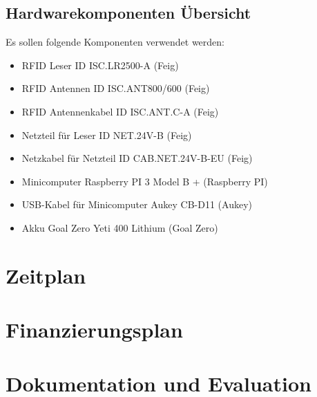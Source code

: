 \section{Hardwarekomponenten Übersicht}
Es sollen folgende Komponenten verwendet werden:
\begin{itemize}
	\item RFID Leser ID ISC.LR2500-A  (Feig)
	\item RFID Antennen ID ISC.ANT800/600 (Feig)
	\item RFID Antennenkabel ID ISC.ANT.C-A (Feig)
	\item Netzteil für Leser ID NET.24V-B (Feig)
	\item Netzkabel für Netzteil ID CAB.NET.24V-B-EU  (Feig)
	\item Minicomputer Raspberry PI 3 Model B + (Raspberry PI)
	\item USB-Kabel für Minicomputer Aukey CB-D11 (Aukey)
	\item Akku Goal Zero Yeti 400 Lithium (Goal Zero)
\end{itemize}

\chapter{Zeitplan}

\chapter{Finanzierungsplan}

\chapter{Dokumentation und Evaluation}
